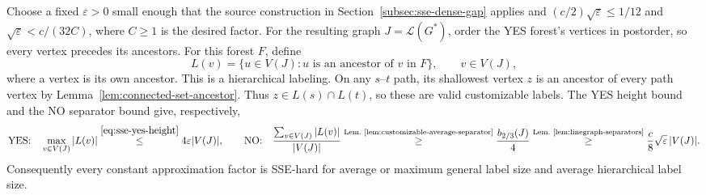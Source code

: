 Choose a fixed $\varepsilon>0$ small enough that the source
construction in Section~\ref{subsec:sse-dense-gap} applies and
$(c/2)\sqrt\varepsilon\leq1/12$ and
$\sqrt\varepsilon<c/(32C)$, where $C\ge1$ is the desired factor.
For the resulting graph $J=\mathcal L(G^*)$, order the YES forest's
vertices in postorder, so every vertex precedes its ancestors. For
this forest $F$, define
\[
 L(v)=\{u\in V(J):u\text{ is an ancestor of }v\text{ in }F\},
 \qquad v\in V(J),
\]
where a vertex is its own ancestor. This is a hierarchical labeling.
On any $s$--$t$ path, its shallowest vertex $z$ is an ancestor of
every path vertex by Lemma~\ref{lem:connected-set-ancestor}.
Thus $z\in L(s)\cap L(t)$,
so these are valid customizable labels. The YES height bound and the
NO separator bound give, respectively,
\[
 \textup{YES:}\quad\max_{v\in V(J)}|L(v)|
 \overset{\eqref{eq:sse-yes-height}}{\leq}4\varepsilon |V(J)|,
 \qquad
 \textup{NO:}\quad\frac{\sum_{v\in V(J)}|L(v)|}{|V(J)|}
 \overset{\text{Lem.~\ref{lem:customizable-average-separator}}}{\geq}\frac{b_{2/3}(J)}4
 \overset{\text{Lem.~\ref{lem:linegraph-separators}}}{\geq}
 \frac c8\sqrt\varepsilon\,|V(J)|.
\]
Consequently every constant
approximation factor is SSE-hard for average or maximum general
label size and average hierarchical label size.

